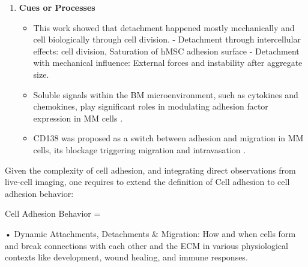 \begin{enumerate}
      \item \textbf{Cues or Processes}
            \begin{itemize}
                  \item This work showed that detachment happened mostly
                        mechanically and cell biologically through cell
                        division. - Detachment through intercellular effects:
                        cell division, Saturation of hMSC adhesion surface -
                        Detachment with mechanical influence: External forces
                        and instability after aggregate size.
                  \item Soluble signals within the BM microenvironment, such as
                        cytokines and chemokines, play significant roles in modulating
                        adhesion factor expression in MM cells
                        \cite{aggarwalChemokinesMultipleMyeloma2006, alsayedMechanismsRegulationCXCR42007}.
                  \item CD138 was proposed as a switch between adhesion and
                        migration in MM cells, its blockage triggering migration
                        and intravasation
                        \cite{akhmetzyanovaDynamicCD138Surface2020}.
            \end{itemize}
\end{enumerate}











Given the complexity of cell adhesion, and integrating direct observations from
live-cell imaging, one requires to extend the definition of Cell adhesion
to cell adhesion behavior:

Cell Adhesion Behavior =

• Dynamic Attachments, Detachments \& Migration: How and when cells form and
break connections with each other and the ECM in various physiological contexts
like development, wound healing, and immune responses.

